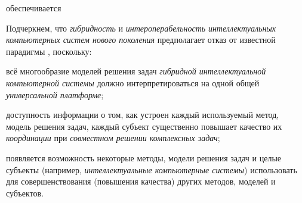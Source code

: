 \begin{SCn}


\begin{scnrelfromlistcustom}{обеспечивается}
\end{scnrelfromlistcustom}
\end{SCn}

Подчеркнем, что \textit{гибридность} и \textit{интероперабельность} \textit{интеллектуальных компьютерных систем нового поколения} предполагает отказ от известной парадигмы , поскольку:

\begin{textitemize}
	\item
	всё многообразие моделей решения задач \textit{гибридной интеллектуальной компьютерной системы} должно интерпретироваться на одной общей \textit{универсальной платформе};
	\item
	доступность информации о том, как устроен каждый используемый метод, модель решения задач, каждый субъект существенно повышает качество их \textit{координации} при \textit{совместном решении комплексных задач};
	\item
	появляется возможность некоторые методы, модели решения задач и целые субъекты (например, \textit{интеллектуальные компьютерные системы}) использовать для совершенствования (повышения качества) других методов, моделей и субъектов.
\end{textitemize}

